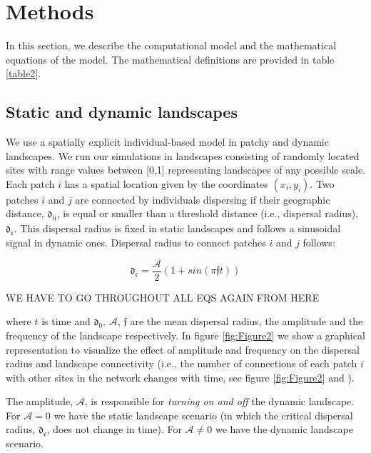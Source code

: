 \documentclass[a4paper,12pt]{article}
\begin{document}
    
\section*{Methods}

In this section, we describe the computational model and the mathematical equations of the model. The mathematical definitions are provided in table \ref{table2}.

\subsection*{Static and dynamic landscapes}

We use a spatially explicit individual-based model in patchy and dynamic landscapes. We run our simulations in landscapes consisting of randomly located sites with range values between [0,1] representing landscapes of any possible scale. Each patch $i$ has a spatial location given by the coordinates $(x_{i}, y_{i})$. Two patches $i$ and $j$ are connected by individuals dispersing if their geographic distance, $\mathfrak{d_{ij}}$, is equal or smaller than a threshold distance (i.e., dispersal radius), $\mathfrak{d_{c}}$. This dispersal radius is fixed in static landscapes and follows a sinusoidal signal in dynamic ones. Dispersal radius to connect patches $i$ and $j$ follows:

\begin{equation}
\mathfrak{d_{c}} = \frac{\mathcal{A}}{2} (1 + sin(\pi \mathfrak{f} t))
\label{eq:ratioAf}
\end{equation}


WE HAVE TO GO THROUGHOUT ALL EQS AGAIN FROM HERE    



where $t$ is time and $\mathfrak{d_{0}}$, $\mathcal{A}$, $\mathfrak{f}$ are the mean dispersal radius, the amplitude and the frequency of the landscape respectively. In figure \ref{fig:Figure2} we show a graphical representation to visualize the effect of amplitude and frequency on the dispersal radius and landscape connectivity (i.e., the number of connections of each patch $i$ with other sites in the network changes with time, see figure \ref{fig:Figure2}  and ). 

The amplitude, $\mathcal{A}$, is responsible for \emph{turning on and off} the dynamic landscape. For $\mathcal{A} = 0$ we have the static landscape scenario (in which the critical dispersal radius, $\mathfrak{d_{c}}$, does not change in time). For $\mathcal{A} \neq 0$ we have the dynamic landscape scenario. 
\end{document}

